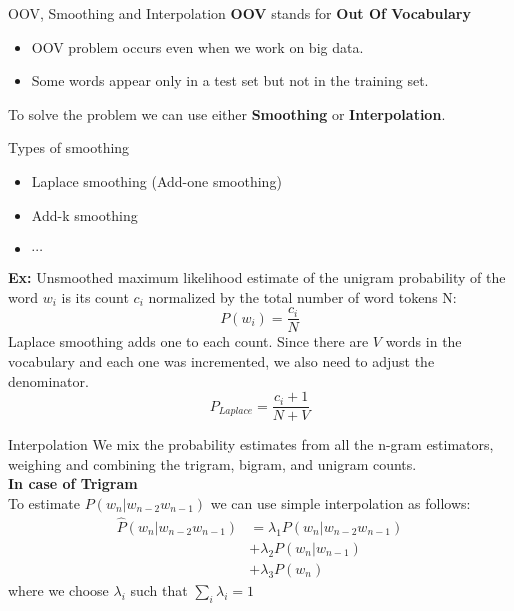 \documentclass{beamer}
\begin{document}
\begin{frame}{OOV, Smoothing and Interpolation}
    \textbf{OOV} stands for \textbf{Out Of Vocabulary}\\
    \begin{itemize}
        \item OOV problem occurs even when we work on big data.
        \item Some words appear only in a test set but not in the training set.
    \end{itemize}
    To solve the problem we can use either \textbf{Smoothing} or \textbf{Interpolation}.
\end{frame}

\begin{frame}{Types of smoothing}
    \begin{itemize}
        \item Laplace smoothing (Add-one smoothing)
        \item Add-k smoothing
        \item $\cdots$
    \end{itemize}
    \textbf{Ex: }Unsmoothed maximum likelihood estimate of the unigram probability of the word $w_i$ is its count $c_i$ normalized by the total number of word tokens N:\\
    $$P(w_i)=\frac{c_i}{N}$$
    Laplace smoothing adds one to each count. Since there are $V$ words in the vocabulary and each one was incremented, we also need to adjust the denominator.\\
    $$P_{Laplace}=\frac{c_i+1}{N+V}$$
\end{frame}

\begin{frame}{Interpolation}
We mix the probability estimates from all the n-gram estimators, weighing and combining the trigram, bigram, and unigram counts.\\
    \textbf{In case of Trigram}\\
    To estimate $P(w_n|w_{n-2}w_{n-1})$ we can use simple interpolation as follows:
    \begin{align*}
        \hat{P} (w_n|w_{n-2}w_{n-1}) &= \lambda_1P(w_n|w_{n-2}w_{n-1})\\
                                     &+ \lambda_2P(w_n|w_{n-1})\\
                                     &+ \lambda_3P(w_n)
    \end{align*}
    where we choose $\lambda_i$ such that $\sum_i\lambda_i = 1$
\end{frame}
\end{document}
